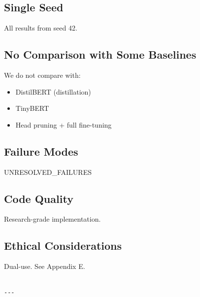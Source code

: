 \subsection{Single Seed}

All results from seed 42.

\subsection{No Comparison with Some Baselines}

We do not compare with:
\begin{itemize}
\item DistilBERT (distillation)
\item TinyBERT
\item Head pruning + full fine-tuning

\end{itemize}
\subsection{Failure Modes}

{{UNRESOLVED\_FAILURES}}

\subsection{Code Quality}

Research-grade implementation.

\subsection{Ethical Considerations}

Dual-use. See Appendix E.
\begin{lstlisting}

---
\end{lstlisting}